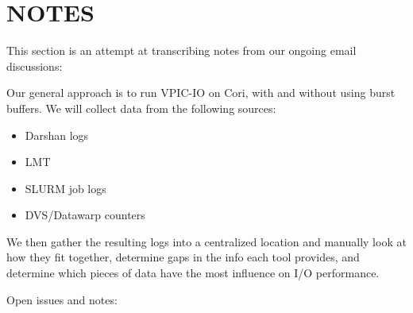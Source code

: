 \documentclass[conference,10pt,compsocconf]{IEEEtran}
\begin{document}
\section{NOTES}

This section is an attempt at transcribing notes from our ongoing email
discussions:

Our general approach is to run VPIC-IO on Cori, with and without using
burst buffers. We will collect data from the following sources:

\begin{itemize}
\item Darshan logs
\item LMT
\item SLURM job logs
\item DVS/Datawarp counters
\end{itemize}

We then gather the resulting logs into a centralized location and manually
look at how they fit together, determine gaps in the info each tool provides,
and determine which pieces of data have the most influence on I/O performance.

Open issues and notes:
\end{document}
